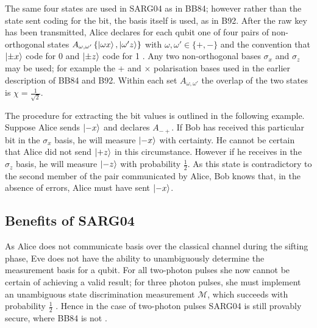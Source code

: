 \documentclass[paper=a4, fontsize=11pt]{scrartcl} %
\numberwithin{equation}{section} %
\numberwithin{figure}{section} %
\numberwithin{table}{section} %
\begin{document}
The same four states are used in SARG04 as in BB84; however rather than the state sent coding for the bit, the basis itself is used, as in B92.
After the raw key has been transmitted, Alice declares for each qubit one of four pairs of
non-orthogonal states $A_{\omega, \omega'} \left\{ \ket{\omega x}, \ket{\omega' z}\right\}$ with $\omega, \omega' \in \{ +, -\}$
and the convention that $\ket{\pm x}$ code for 0 and $\ket{\pm z}$ code for 1 \citep{SARG04orig}. Any two non-orthogonal bases $\sigma_x$
and $\sigma_z$ may be used; for example the + and $\times$ polarisation bases used in the earlier description of BB84 and B92. Within each set $A_{\omega, \omega'}$
the overlap of the two states is $\chi = \frac{1}{\sqrt{2}}$.

The procedure for extracting the bit values is outlined in the following example. Suppose Alice sends $\ket{-x}$ and declares $A_{- +}$.
If Bob has received this particular bit in the $\sigma_x$ basis, he will measure $\ket{-x}$ with certainty. He cannot be certain that Alice did
not send $\ket{+z}$ in this circumstance. However if he receives in the $\sigma_z$ basis, he will measure $\ket{-z}$ with probability $\frac{1}{2}$.
As this state is contradictory to the second member of the pair communicated by Alice, Bob knows that, in the absence of errors, Alice must have sent $\ket{-x}$.

\subsection{Benefits of SARG04}
As Alice does not communicate basis over the classical channel during the sifting phase, Eve does not have the ability to
unambiguously determine the measurement basis for a qubit. For all two-photon pulses she now cannot be certain of achieving
a valid result; for three photon pulses, she must implement an unambiguous state discrimination measurement $\mathcal{M}$, which succeeds with probability
$\frac{1}{2}$ \citep{branciardSARG04}. Hence in the case of two-photon pulses SARG04 is still provably secure, where BB84 is not \citep{perf2protocols}.
\end{document}
